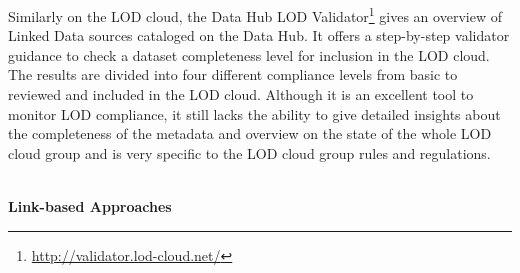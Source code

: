 Similarly on the LOD cloud, the Data Hub LOD Validator\footnote{\url{http://validator.lod-cloud.net/}} gives an overview of Linked Data sources cataloged on the Data Hub. It offers a step-by-step validator guidance to check a dataset completeness level for inclusion in the LOD cloud. The results are divided into four different compliance levels from basic to reviewed and included in the LOD cloud. Although it is an excellent tool to monitor LOD compliance, it still lacks the ability to give detailed insights about the completeness of the metadata and overview on the state of the whole LOD cloud group and is very specific to the LOD cloud group rules and regulations.

\indent \\{\bf Link-based Approaches}\\

